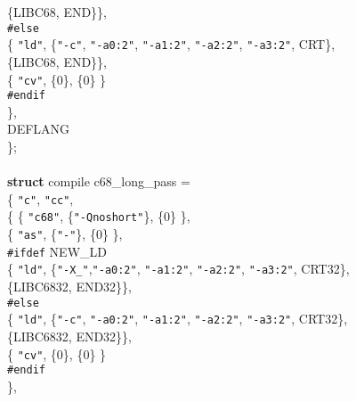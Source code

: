 \begin{flushleft}
\hspace*{9\indentation}\{LIBC68, END\}\},\mbox{}\\
{\tt \#else}\mbox{}\\
\hspace*{6\indentation}\{ {\tt"ld"}, \{{\tt"-c"}, {\tt"-a0:2"}, {\tt"-a1:2"}, {\tt"-a2:2"}, {\tt"-a3:2"}, CRT\}, \mbox{}\\
\hspace*{11\indentation}\{LIBC68, END\}\},\mbox{}\\
\hspace*{6\indentation}\{ {\tt"cv"}, \{0\}, \{0\} \}\mbox{}\\
{\tt \#endif}\mbox{}\\
\hspace*{3\indentation}\},\mbox{}\\
\hspace*{3\indentation}DEFLANG\mbox{}\\
\};\mbox{}\\
\mbox{}\\
{\bf struct} compile c68\_long\_pass =\mbox{}\\
\{  {\tt"c"}, {\tt"cc"},\mbox{}\\
\hspace*{3\indentation}\{  \{ {\tt"c68"}, \{{\tt"-Qnoshort"}\}, \{0\} \},\mbox{}\\
\hspace*{6\indentation}\{ {\tt"as"}, \{{\tt"-"}\}, \{0\} \},\mbox{}\\
{\tt \#ifdef} NEW\_LD\mbox{}\\
\hspace*{6\indentation}\{ {\tt"ld"}, \{{\tt"-X\_"},{\tt"-a0:2"}, {\tt"-a1:2"}, {\tt"-a2:2"}, {\tt"-a3:2"}, CRT32\},\mbox{}\\
\hspace*{9\indentation}\{LIBC6832, END32\}\},\mbox{}\\
{\tt \#else}\mbox{}\\
\hspace*{6\indentation}\{ {\tt"ld"}, \{{\tt"-c"}, {\tt"-a0:2"}, {\tt"-a1:2"}, {\tt"-a2:2"}, {\tt"-a3:2"}, CRT32\}, \mbox{}\\
\hspace*{11\indentation}\{LIBC6832, END32\}\},\mbox{}\\
\hspace*{6\indentation}\{ {\tt"cv"}, \{0\}, \{0\} \}\mbox{}\\
{\tt \#endif}\mbox{}\\
\hspace*{3\indentation}\},\mbox{}\\

\end{flushleft}
